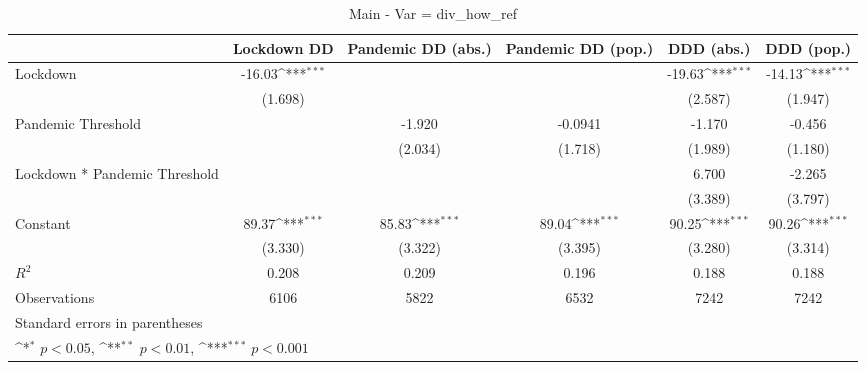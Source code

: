 \documentclass{article}
\begin{document}
{
\def\sym#1{\ifmmode^{#1}\else\(^{#1}\)\fi}
\begin{longtable}{l*{5}{c}}
\caption{Main - Var = div\_how\_ref}\\
\hline\hline\endfirsthead\hline\endhead\hline\endfoot\endlastfoot
                &\multicolumn{1}{c}{Lockdown DD}&\multicolumn{1}{c}{Pandemic DD (abs.)}&\multicolumn{1}{c}{Pandemic DD (pop.)}&\multicolumn{1}{c}{DDD (abs.)}&\multicolumn{1}{c}{DDD (pop.)}\\
\hline
Lockdown        &   -16.03\sym{***}&                  &                  &   -19.63\sym{***}&   -14.13\sym{***}\\
                &  (1.698)         &                  &                  &  (2.587)         &  (1.947)         \\
Pandemic Threshold&                  &   -1.920         &  -0.0941         &   -1.170         &   -0.456         \\
                &                  &  (2.034)         &  (1.718)         &  (1.989)         &  (1.180)         \\
Lockdown * Pandemic Threshold&                  &                  &                  &    6.700         &   -2.265         \\
                &                  &                  &                  &  (3.389)         &  (3.797)         \\
Constant        &    89.37\sym{***}&    85.83\sym{***}&    89.04\sym{***}&    90.25\sym{***}&    90.26\sym{***}\\
                &  (3.330)         &  (3.322)         &  (3.395)         &  (3.280)         &  (3.314)         \\
\hline
\(R^{2}\)       &    0.208         &    0.209         &    0.196         &    0.188         &    0.188         \\
Observations    &     6106         &     5822         &     6532         &     7242         &     7242         \\
\hline\hline
\multicolumn{6}{l}{\footnotesize Standard errors in parentheses}\\
\multicolumn{6}{l}{\footnotesize \sym{*} \(p<0.05\), \sym{**} \(p<0.01\), \sym{***} \(p<0.001\)}\\
\end{longtable}
}
\end{document}
